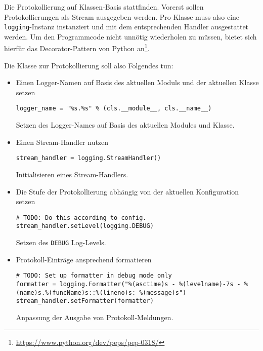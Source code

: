 \documentclass[10pt, openright, notitlepage]{scrreprt}
\begin{document}
Die Protokollierung auf Klassen-Basis stattfinden. Vorerst sollen
Protokollierungen als Stream ausgegeben werden. Pro Klasse muss also eine
\texttt{logging}-Instanz instanziert und mit dem entsprechenden Handler ausgestattet
werden. Um den Programmcode nicht unnötig wiederholen zu müssen, bietet sich
hierfür das Decorator-Pattern von Python
an\footnote{\url{https://www.python.org/dev/peps/pep-0318/}}.

Die Klasse zur Protokollierung soll also Folgendes tun:

\begin{itemize}
\item Einen Logger-Namen auf Basis des aktuellen Moduls und der aktuellen Klasse setzen
\begin{listing}[H]
\begin{verbatim}
logger_name = "%s.%s" % (cls.__module__, cls.__name__)
\end{verbatim}
\caption{\label{org4c0fe08}
Setzen des Logger-Names auf Basis des aktuellen Modules und Klasse.}
\end{listing}

\item Einen Stream-Handler nutzen
\begin{listing}[H]
\begin{verbatim}
stream_handler = logging.StreamHandler()
\end{verbatim}
\caption{\label{orgaeb5dce}
Initialisieren eines Stream-Handlers.}
\end{listing}

\item Die Stufe der Protokollierung abhängig von der aktuellen Konfiguration setzen
\begin{listing}[H]
\begin{verbatim}
# TODO: Do this according to config.
stream_handler.setLevel(logging.DEBUG)
\end{verbatim}
\caption{\label{org99b92eb}
Setzen des \texttt{DEBUG} Log-Levels.}
\end{listing}

\item Protokoll-Einträge ansprechend formatieren
\begin{listing}[H]
\begin{verbatim}
# TODO: Set up formatter in debug mode only
formatter = logging.Formatter("%(asctime)s - %(levelname)-7s - %(name)s.%(funcName)s::%(lineno)s: %(message)s")
stream_handler.setFormatter(formatter)
\end{verbatim}
\caption{\label{orge5e37a6}
Anpassung der Ausgabe von Protokoll-Meldungen.}
\end{listing}


\end{itemize}
\end{document}
